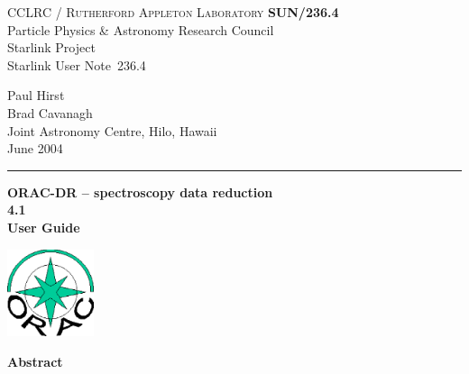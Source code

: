 \documentclass[twoside,11pt]{article}
\newcommand{\stardoccategory}  {Starlink User Note}
\newcommand{\stardocinitials}  {SUN}
\newcommand{\stardocnumber}    {236.4}
\newcommand{\stardocauthors}   {Paul Hirst \\ Brad Cavanagh \\
                                Joint Astronomy Centre, Hilo, Hawaii}
\newcommand{\stardocdate}      {June 2004}
\newcommand{\stardoctitle}     {ORAC-DR -- spectroscopy data reduction}
\newcommand{\stardocversion}   {4.1}
\newcommand{\stardocmanual}    {User Guide}
\newcommand{\stardocname}{\stardocinitials /\stardocnumber}
\newenvironment{latexonly}{}{}
\renewcommand{\_}{\texttt{\symbol{95}}}
\begin{document}
\setcounter{secnumdepth}{5}
\thispagestyle{empty}

\begin{latexonly}
   CCLRC / \textsc{Rutherford Appleton Laboratory} \hfill \textbf{\stardocname}\\
   {\large Particle Physics \& Astronomy Research Council}\\
   {\large Starlink Project\\}
   {\large \stardoccategory\ \stardocnumber}
   \begin{flushright}
   \stardocauthors\\
   \stardocdate
   \end{flushright}
   \vspace{-4mm}
   \rule{\textwidth}{0.5mm}
   \vspace{5mm}
   \begin{center}
   {\Huge\textbf{\stardoctitle \\ [2.5ex]}}
   {\LARGE\textbf{\stardocversion \\ [4ex]}}
   {\Huge\textbf{\stardocmanual}}
   \end{center}
   \vspace{5mm}

\begin{center}
\includegraphics[width=1.0in]{sun236_logo.eps}
\end{center}

   \vspace{10mm}
   \begin{center}
      {\Large\textbf{Abstract}}
   \end{center}
\end{latexonly}
\end{document}
